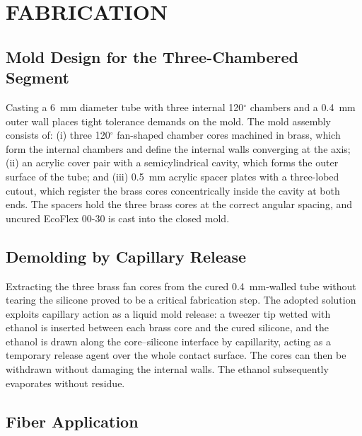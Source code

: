 

\section{FABRICATION}
\label{sec:lizard-fabrication}

\subsection{Mold Design for the Three-Chambered Segment}

Casting a 6~mm diameter tube with three internal 120$^{\circ}$ chambers
and a 0.4~mm outer wall places tight tolerance demands on the mold. The
mold assembly consists of: (i) three 120$^{\circ}$ fan-shaped chamber
cores machined in brass, which form the internal chambers and define the
internal walls converging at the axis; (ii) an acrylic cover pair with a
semicylindrical cavity, which forms the outer surface of the tube; and
(iii) 0.5~mm acrylic spacer plates with a three-lobed cutout, which
register the brass cores concentrically inside the cavity at both ends. The spacers hold the three brass cores at the correct
angular spacing, and uncured EcoFlex 00-30 is
cast into the closed mold.

\subsection{Demolding by Capillary Release}

Extracting the three brass fan cores from the cured 0.4~mm-walled tube
without tearing the silicone proved to be a critical fabrication step.
The adopted solution exploits capillary action as a liquid mold release:
a tweezer tip wetted with ethanol is inserted between each brass core and
the cured silicone, and the ethanol is drawn along the core--silicone
interface by capillarity, acting as a temporary release agent over the
whole contact surface. The cores can then be withdrawn without damaging
the internal walls. The ethanol subsequently evaporates without residue.

\subsection{Fiber Application}

